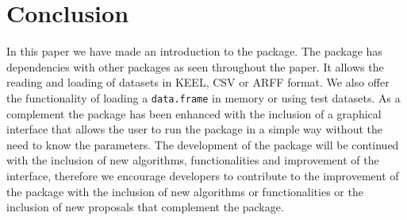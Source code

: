 \section{Conclusion}

In this paper we have made an introduction to the  package. The package has dependencies with other packages as seen throughout the paper. It allows the reading and loading of datasets in KEEL, CSV or ARFF format. We also offer the functionality of loading a \texttt{data.frame} in memory or using test datasets. As a complement the package has been enhanced with the inclusion of a graphical interface that allows the user to run the package in a simple way without the need to know the parameters. The development of the package will be continued with the inclusion of new algorithms, functionalities and improvement of the interface, therefore we encourage developers to contribute to the improvement of the package with the inclusion of new algorithms or functionalities or the inclusion of new proposals that complement the package.



\address{Luis Alfonso Pérez Martos\\
  Computer Department\\
  University of Jaén\\
  Spain\\
  (ORCiD if desired)\\
  }

\address{Ángel Miguel García Vico\\
  Computer Department\\
  University of Jaén\\
  Spain\\
  (ORCiD if desired)\\
  }

\address{Pedro González\\
  Computer Department\\
  University of Jaén\\
  Spain\\
  (ORCiD if desired)\\
  }

\address{Cristóbal J. Carmona\\
  Computer Department\\
  University of Jaén\\
  Spain\\
  (ORCiD if desired)\\
  }
